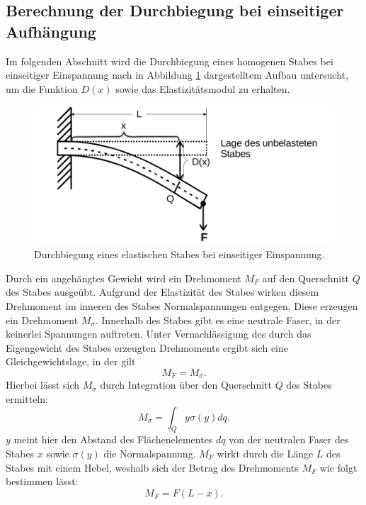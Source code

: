 \subsection{Berechnung der Durchbiegung bei einseitiger Aufhängung}
\label{sec:einseitigg}
Im folgenden Abschnitt wird die Durchbiegung eines homogenen Stabes bei einseitiger
Einspannung nach in Abbildung \ref{fig:einseitig} dargestelltem Aufbau untersucht,
um die Funktion $D(x)$ sowie das Elastizitätsmodul zu erhalten.
\begin{figure}[H]
  \centering
  \includegraphics[scale=0.4]{content/EinspannungEinseitig.png}
  \caption{Durchbiegung eines elastischen Stabes bei einseitiger Einspannung. \cite{AP01}}
  \label{fig:einseitig}
\end{figure}
\noindent
Durch ein angehängtes Gewicht wird ein Drehmoment $M_F$ auf den Querschnitt $Q$ des
Stabes ausgeübt. Aufgrund der Elastizität des Stabes wirken diesem Drehmoment im
inneren des Stabes Normalspannungen entgegen. Diese erzeugen ein Drehmoment $M_\sigma$.
Innerhalb des Stabes gibt es eine neutrale Faser, in der keinerlei Spannungen auftreten.
Unter Vernachlässigung des durch das Eigengewicht des Stabes erzeugten Drehmoments
ergibt sich eine Gleichgewichtslage, in der gilt
\begin{equation}
  M_F = M_\sigma .
  \label{eqn:momentengleichung1}
\end{equation}
Hierbei lässt sich $M_\sigma$ durch Integration über den Querschnitt $Q$ des Stabes
ermitteln:
\begin{equation}
  M_\sigma = \int_Q  y \sigma(y) dq.
  \label{eqn:msigma}
\end{equation}
$y$ meint hier den Abstand des Flächenelementes $dq$ von der neutralen Faser
des Stabes $x$ sowie $\sigma(y)$ die Normalspannung.
$M_F$ wirkt durch die Länge $L$ des Stabes mit einem Hebel, weshalb sich der Betrag des Drehmoments
$M_F$ wie folgt bestimmen lässt:
\begin{equation}
  M_F = F(L - x).
  \label{eqn:mf}
\end{equation}
